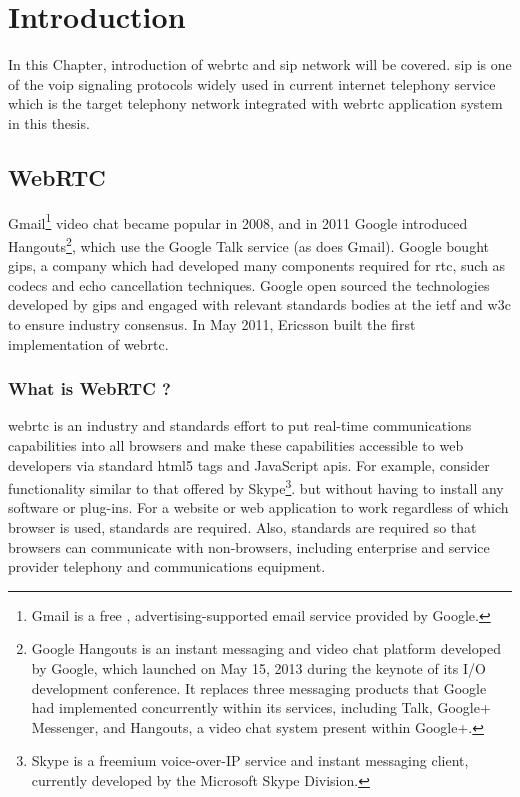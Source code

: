 \chapter{Introduction}
\label{chp:intro}
\noindent In this Chapter, introduction of \gls{webrtc} and \gls{sip} network will be covered. \gls{sip} is one of the \gls{voip} signaling protocols widely used in current internet telephony service which is the target telephony network integrated with \gls{webrtc} application system in this thesis.

\section{WebRTC}

\noindent Gmail\footnote{Gmail is a free , advertising-supported email service provided by Google.} video chat became popular in 2008, and in 2011 Google introduced Hangouts\footnote{Google Hangouts is an instant messaging and video chat platform developed by Google, which launched on May 15, 2013 during the keynote of its I/O development conference. It replaces three messaging products that Google had implemented concurrently within its services, including Talk, Google+ Messenger, and Hangouts, a video chat system present within Google+.}, which use the Google Talk service (as does Gmail). Google bought \gls{gips}, a company which had developed many components required for \gls{rtc}, such as codecs and echo cancellation techniques. Google open sourced the technologies developed by \gls{gips} and engaged with relevant standards bodies at the \gls{ietf} and \gls{w3c} to ensure industry consensus. In May 2011, Ericsson built the first implementation of \gls{webrtc}.

\subsection{What is WebRTC ?}

\noindent \gls{webrtc} is an industry and standards effort to put real-time communications capabilities into all browsers and make these capabilities accessible to web developers via standard \gls{html5} tags and JavaScript \gls{api}s. For example, consider functionality similar to that offered by Skype\footnote{Skype is a freemium voice-over-IP service and instant messaging client, currently developed by the Microsoft Skype Division.\cite{wiki:skype}}. but without having to install any software or plug-ins. For a website or web application to work regardless of which browser is used, standards are required. Also, standards are required so that browsers can communicate with non-browsers, including enterprise and service provider telephony and communications equipment\cite{inbook:rtc-intro}.

